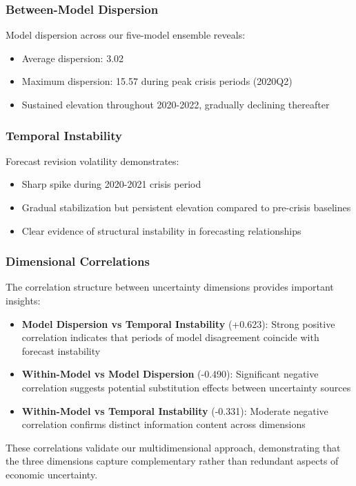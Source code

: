 \documentclass[5p,authoryear]{elsarticle}
\begin{document}
\subsubsection{Between-Model Dispersion}
Model dispersion across our five-model ensemble reveals:
\begin{itemize}
    \item Average dispersion: 3.02 
    \item Maximum dispersion: 15.57 during peak crisis periods (2020Q2)
    \item Sustained elevation throughout 2020-2022, gradually declining thereafter
\end{itemize}

\subsubsection{Temporal Instability}
Forecast revision volatility demonstrates:
\begin{itemize}
    \item Sharp spike during 2020-2021 crisis period
    \item Gradual stabilization but persistent elevation compared to pre-crisis baselines
    \item Clear evidence of structural instability in forecasting relationships
\end{itemize}

\subsubsection{Dimensional Correlations}
The correlation structure between uncertainty dimensions provides important insights:

\begin{itemize}
    \item \textbf{Model Dispersion vs Temporal Instability} (+0.623): Strong positive correlation indicates that periods of model disagreement coincide with forecast instability
    \item \textbf{Within-Model vs Model Dispersion} (-0.490): Significant negative correlation suggests potential substitution effects between uncertainty sources
    \item \textbf{Within-Model vs Temporal Instability} (-0.331): Moderate negative correlation confirms distinct information content across dimensions
\end{itemize}

These correlations validate our multidimensional approach, demonstrating that the three dimensions capture complementary rather than redundant aspects of economic uncertainty.
\end{document}
